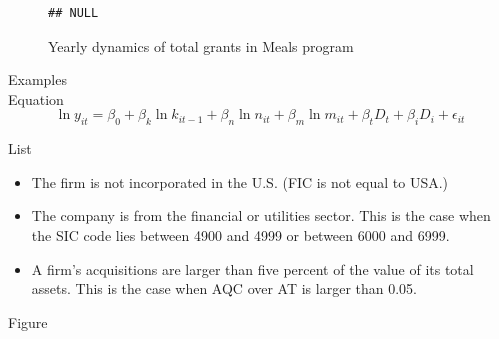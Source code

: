 \documentclass[12pt, a4paper]{article}\usepackage[]{graphicx}\usepackage[]{color}
\makeatletter
\newenvironment{kframe}{%
 \def\at@end@of@kframe{}%
 \ifinner\ifhmode%
  \def\at@end@of@kframe{\end{minipage}}%
  \begin{minipage}{\columnwidth}%
 \fi\fi%
 \def\FrameCommand##1{\hskip\@totalleftmargin \hskip-\fboxsep
 \colorbox{shadecolor}{##1}\hskip-\fboxsep
     \hskip-\linewidth \hskip-\@totalleftmargin \hskip\columnwidth}%
 \MakeFramed {\advance\hsize-\width
   \@totalleftmargin\z@ \linewidth\hsize
   \@setminipage}}%
 {\par\unskip\endMakeFramed%
 \at@end@of@kframe}
\newenvironment{knitrout}{}{} %
\makeatother
\begin{document}
\begin{figure}
  \caption{Yearly dynamics of total grants in Meals program}
  \label{totalGrantsDyn}

\begin{knitrout}
\color{fgcolor}\begin{kframe}
\begin{verbatim}
## NULL
\end{verbatim}
\end{kframe}
\end{knitrout}

\end{figure}




Examples\\

Equation\\

\begin{equation}
\label{ModelProdu}
\ln y_{it} = \beta_0 + \beta_k \ln k_{it-1} + \beta_n \ln n_{it} + \beta_m \ln m_{it} + \beta_t D_t + \beta_i D_i + \epsilon_{it}
\end{equation}

List\\

\begin{itemize}
  \item{The firm is not incorporated in the U.S. (FIC is not equal to USA.)}
  \item{The company is from the financial or utilities sector. This is the case when the SIC code lies between 4900 and 4999 or between 6000 and 6999.}
  \item{A firm's acquisitions are larger than five percent of the value of its total assets. This is the case when AQC over AT is larger than 0.05.} 
\end{itemize}


Figure
\end{document}

